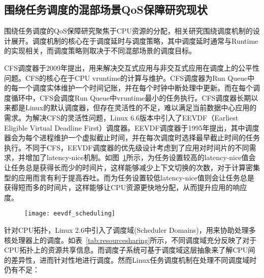 \subsection{围绕任务调度的混部场景QoS保障研究现状}


围绕任务调度的QoS保障研究聚焦于CPU资源的分配，相关研究围绕调度机制的设计展开。调度机制的核心在于调度延时与调度策略，其中调度延时通常与Runtime的实现相关，而调度策略则取决于不同混部场景的调度目标。

CFS调度器\citep{pabla2009completely}于2009年提出，用来解决交互式应用与非交互式应用在调度上的公平性问题。CFS的核心在于CPU vruntime的计算与维护。CFS调度器为Run Queue中的每一个调度实体维护一个时间记账，并在每个时钟中断处理中更新。而在每个调度循环中，CFS会调度Run Queue中vruntime最小的任务执行。CFS调度器长期以来都是Linux的默认调度器，但存在灵活性的不足，难以满足当前数据中心应用的需求。为解决CFS的灵活性问题，Linux 6.6版本中引入了EEVDF（Earliest Eligible Virtual Deadline First）调度器。EEVDF调度器\citep{stoica1995earliest}于1995年提出，其中调度器会为每个进程维护一个虚拟截止时间，并在每次调度时选择最早截止时间的任务执行。不同于CFS，EEVDF调度器的优先级设计考虑到了应用对时间片的不同需求，并增加了latency-nice机制。如图~\ref{fig:eevdf_scheduling}所示，为任务设置较高的latency-nice值会让任务总是获得长而少的时间片，这样能够减少上下文切换的次数，对于计算密集型的应用而言有利于提高吞吐。而为任务设置较低latency-nice值则会让任务总是获得短而多的时间片，这样能够让CPU资源更快地分配，从而提升应用的响应度。

\begin{figure}[!htbp]
    \centering
    \texttt{[image: eevdf\_scheduling]}
    \label{fig:eevdf_scheduling}
\end{figure}

针对CPU拓扑，Linux 2.6中引入了调度域(Scheduler Domains)\citep{schedulerdomains}，用来协助处理多核处理器上的调度。如表~\ref{tab:resourcesharing}所示，不同调度域充分反映了对于CPU拓扑上的资源共享信息。而调度子系统可基于调度域这层抽象来了解CPU间的差异性，进而针对性地进行调度。然而Linux任务调度机制在处理不同调度域时仍有不足：

